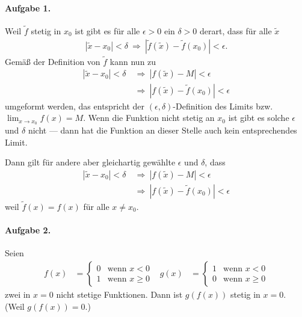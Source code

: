 \documentclass{article}
\begin{document}
\paragraph{Aufgabe 1.} Weil $\tilde{f}$ stetig in $x_0$ ist gibt es für alle $\epsilon > 0$ ein $\delta > 0$ derart, dass für alle $\tilde{x}$
\begin{align*}
    |\tilde{x} - x_0| < \delta\ \Rightarrow\ |\tilde{f}(\tilde{x}) - \tilde{f}(x_0)| < \epsilon.
\end{align*}
Gemäß der Definition von $\tilde{f}$ kann nun zu
\begin{align*}
    |\tilde{x} - x_0| < \delta\ &\Rightarrow\ |f(\tilde{x}) - M| < \epsilon \\
    &\Rightarrow\ |f(\tilde{x}) - \tilde{f}(x_0)| < \epsilon
\end{align*}
umgeformt werden, das entspricht der $(\epsilon, \delta)$-Definition des Limits bzw. $\lim_{x \to x_0}f(x) = M$. Wenn die Funktion nicht stetig an $x_0$ ist gibt es solche $\epsilon$ und $\delta$ nicht --- dann hat die Funktion an dieser Stelle auch kein entsprechendes Limit. 

Dann gilt für andere aber gleichartig gewählte $\epsilon$ und $\delta$, dass
\begin{align*}
    |\tilde{x} - x_0| < \delta\ &\Rightarrow\ |f(\tilde{x}) - M| < \epsilon \\
    &\Rightarrow\ |f(\tilde{x}) - \tilde{f}(x_0)| < \epsilon
\end{align*}
weil $\tilde{f}(x) = f(x)$ für alle $x \neq x_0$.

\paragraph{Aufgabe 2.} Seien
\begin{align*}
    f(x) &= \begin{cases}
        0 & \text{wenn $x < 0$} \\
        1 & \text{wenn $x \geq 0$}
    \end{cases}
    &
    g(x) &= \begin{cases}
        1 & \text{wenn $x < 0$} \\
        0 & \text{wenn $x \geq 0$}
    \end{cases}
\end{align*}
zwei in $x = 0$ nicht stetige Funktionen. Dann ist $g(f(x))$ stetig in $x = 0$. (Weil $g(f(x)) = 0$.)
\end{document}
